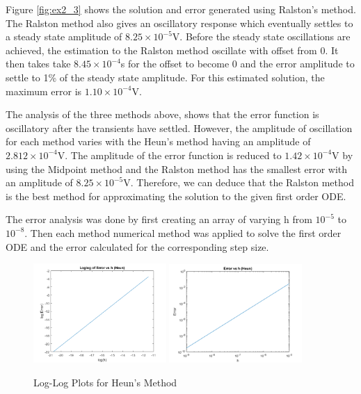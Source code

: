 \documentclass[11pt, oneside, titlepage]{article}   	%
\begin{document}
Figure \ref{fig:ex2_3} shows the solution and error generated using Ralston's method. The Ralston method also gives an oscillatory response which eventually settles to a steady state amplitude of $8.25\times10^{-5}$V. Before the steady state oscillations are achieved, the estimation to the Ralston method oscillate with offset from 0. It then takes take $8.45\times10^{-4}$s for the offset to become 0 and the error amplitude to settle to 1\% of the steady state amplitude. For this estimated solution, the maximum error is $1.10\times10^{-4}$V.

The analysis of the three methods above, shows that the error function is oscillatory after the transients have settled. However, the amplitude of oscillation for each method varies with the Heun's method having an amplitude of $2.812\times10^{-4}$V. The amplitude of the error function is reduced to $1.42\times10^{-4}$V by using the Midpoint method and the Ralston method has the smallest error with an amplitude of $8.25\times10^{-5}$V. Therefore, we can deduce that the Ralston method is the best method for approximating the solution to the given first order ODE. 

The error analysis was done by first creating an array of varying h from $10^{-5}$ to $10^{-8}$. Then each method numerical method was applied to solve the first order ODE and the error calculated for the corresponding step size. 

\begin{figure}[H]
\center
\includegraphics[width = 0.45\textwidth]{exercise2_4a}
\includegraphics[width = 0.45\textwidth]{exercise2_4}
\caption{Log-Log Plots for Heun's Method} 
\end{figure}
\end{document}
